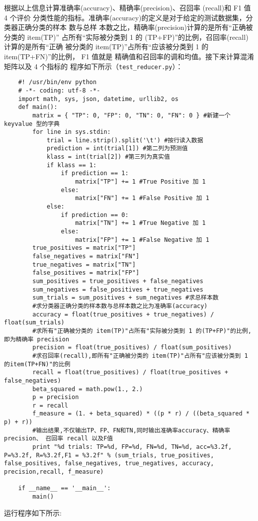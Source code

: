 根据以上信息计算准确率(accuracy)、精确率(precision)、召回率
(recall)和 F1 值 4 个评价
分类性能的指标。准确率(accuracy)的定义是对于给定的测试数据集，分类器正确分类的样本
数与总样 本数之比，精确率(precision)计算的是所有``正确被分类的 item(TP)''
占所有``实际被分类到 1 的
(TP+FP)''的比例，召回率(recall)计算的是所有``正确 被分类的
item(TP)''占所有``应该被分类到 1 的 item(TP+FN)''的比例， F1 值就是
精确值和召回率的调和均值。接下来计算混淆矩阵以及 4 个指标的
程序如下所示（\texttt{test\_reducer.py}）：
\begin{lstlisting}
	#! /usr/bin/env python
	# -*- coding: utf-8 -*-
	import math, sys, json, datetime, urllib2, os
	def main():
	    matrix = { "TP": 0, "FP": 0, "TN": 0, "FN": 0 } #新建一个 keyvalue 型的字典
	    for line in sys.stdin:
	        trial = line.strip().split('\t') #按行读入数据
	        prediction = int(trial[1]) #第二列为预测值
	        klass = int(trial[2]) #第三列为真实值
	        if klass == 1:
	            if prediction == 1:
	                matrix["TP"] += 1 #True Positive 加 1
	            else:
	                matrix["FN"] += 1 #False Positive 加 1
	        else:
	            if prediction == 0:
	                matrix["TN"] += 1 #True Negative 加 1
	            else:
	                matrix["FP"] += 1 #False Negative 加 1
	    true_positives = matrix["TP"]
	    false_negatives = matrix["FN"]
	    true_negatives = matrix["TN"]
	    false_positives = matrix["FP"]
	    sum_positives = true_positives + false_negatives
	    sum_negatives = false_positives + true_negatives
	    sum_trials = sum_positives + sum_negatives #求总样本数
	    #求分类器正确分类的样本数与总样本数之比为准确率(accuracy)
	    accuracy = float(true_positives + true_negatives) / float(sum_trials)
	    #求所有"正确被分类的 item(TP)"占所有"实际被分类到 1 的(TP+FP)"的比例,即为精确率 precision
	    precision = float(true_positives) / float(sum_positives)
	    #求召回率(recall),即所有"正确被分类的 item(TP)"占所有"应该被分类到 1 的item(TP+FN)"的比例
	    recall = float(true_positives) / float(true_positives + false_negatives)
	    beta_squared = math.pow(1., 2.)
	    p = precision
	    r = recall
	    f_measure = (1. + beta_squared) * ((p * r) / ((beta_squared * p) + r))
	    #输出结果,不仅输出TP、FP、FN和TN,同时输出准确率accuracy、精确率precision、 召回率 recall 以及F值
	    print "%d trials: TP=%d, FP=%d, FN=%d, TN=%d, acc=%3.2f, P=%3.2f, R=%3.2f,F1 = %3.2f" % (sum_trials, true_positives, false_positives, false_negatives, true_negatives, accuracy, precision,recall, f_measure)

	if __name__ == '__main__':
	    main()
\end{lstlisting}
运行程序如下所示:


